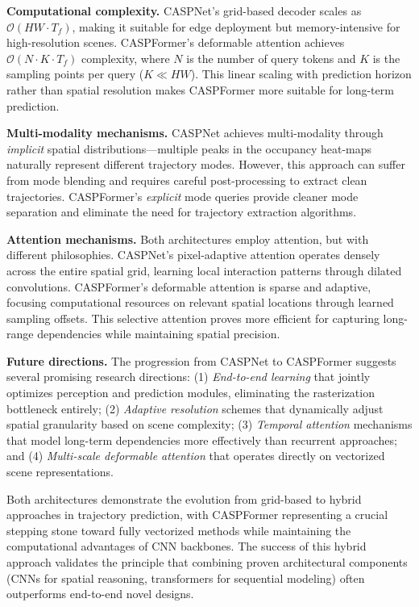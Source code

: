 \begin{description}[leftmargin=1em,itemsep=2pt]
\textbf{Computational complexity.} CASPNet's grid-based decoder scales as \(\mathcal{O}(HW \cdot T_f)\), making it suitable for edge deployment but memory-intensive for high-resolution scenes. CASPFormer's deformable attention achieves \(\mathcal{O}(N \cdot K \cdot T_f)\) complexity, where \(N\) is the number of query tokens and \(K\) is the sampling points per query (\(K \ll HW\)). This linear scaling with prediction horizon rather than spatial resolution makes CASPFormer more suitable for long-term prediction.

\textbf{Multi-modality mechanisms.} CASPNet achieves multi-modality through \emph{implicit} spatial distributions—multiple peaks in the occupancy heat-maps naturally represent different trajectory modes. However, this approach can suffer from mode blending and requires careful post-processing to extract clean trajectories. CASPFormer's \emph{explicit} mode queries provide cleaner mode separation and eliminate the need for trajectory extraction algorithms.

\textbf{Attention mechanisms.} Both architectures employ attention, but with different philosophies. CASPNet's pixel-adaptive attention operates densely across the entire spatial grid, learning local interaction patterns through dilated convolutions. CASPFormer's deformable attention is sparse and adaptive, focusing computational resources on relevant spatial locations through learned sampling offsets. This selective attention proves more efficient for capturing long-range dependencies while maintaining spatial precision.

\textbf{Future directions.} The progression from CASPNet to CASPFormer suggests several promising research directions: (1) \emph{End-to-end learning} that jointly optimizes perception and prediction modules, eliminating the rasterization bottleneck entirely; (2) \emph{Adaptive resolution} schemes that dynamically adjust spatial granularity based on scene complexity; (3) \emph{Temporal attention} mechanisms that model long-term dependencies more effectively than recurrent approaches; and (4) \emph{Multi-scale deformable attention} that operates directly on vectorized scene representations.

Both architectures demonstrate the evolution from grid-based to hybrid approaches in trajectory prediction, with CASPFormer representing a crucial stepping stone toward fully vectorized methods while maintaining the computational advantages of CNN backbones. The success of this hybrid approach validates the principle that combining proven architectural components (CNNs for spatial reasoning, transformers for sequential modeling) often outperforms end-to-end novel designs.


\end{description}
